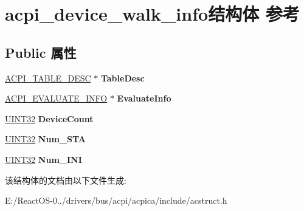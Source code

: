 \hypertarget{structacpi__device__walk__info}{}\section{acpi\+\_\+device\+\_\+walk\+\_\+info结构体 参考}
\label{structacpi__device__walk__info}
\subsection*{Public 属性}
\begin{DoxyCompactItemize}
\item 
\mbox{\label{structacpi__device__walk__info_afed810870ce5d9dfc8f281b346475640}} 
\hyperlink{structacpi__table__desc}{A\+C\+P\+I\+\_\+\+T\+A\+B\+L\+E\+\_\+\+D\+E\+SC} $\ast$ {\bfseries Table\+Desc}
\item 
\mbox{\label{structacpi__device__walk__info_adbcf5d9a73353d2adfb551d7284d5a9a}} 
\hyperlink{structacpi__evaluate__info}{A\+C\+P\+I\+\_\+\+E\+V\+A\+L\+U\+A\+T\+E\+\_\+\+I\+N\+FO} $\ast$ {\bfseries Evaluate\+Info}
\item 
\mbox{\label{structacpi__device__walk__info_aef2092e300e0664719467dbdd42844d4}} 
\hyperlink{_processor_bind_8h_ae1e6edbbc26d6fbc71a90190d0266018}{U\+I\+N\+T32} {\bfseries Device\+Count}
\item 
\mbox{\label{structacpi__device__walk__info_a7ecc5aeb5b9e46703759036b11869082}} 
\hyperlink{_processor_bind_8h_ae1e6edbbc26d6fbc71a90190d0266018}{U\+I\+N\+T32} {\bfseries Num\+\_\+\+S\+TA}
\item 
\mbox{\label{structacpi__device__walk__info_a3e5d751e1263e36276cc9c7ac17e3e92}} 
\hyperlink{_processor_bind_8h_ae1e6edbbc26d6fbc71a90190d0266018}{U\+I\+N\+T32} {\bfseries Num\+\_\+\+I\+NI}
\end{DoxyCompactItemize}


该结构体的文档由以下文件生成\+:\begin{DoxyCompactItemize}
\item 
E\+:/\+React\+O\+S-\/0../drivers/bus/acpi/acpica/include/acstruct.\+h\end{DoxyCompactItemize}
